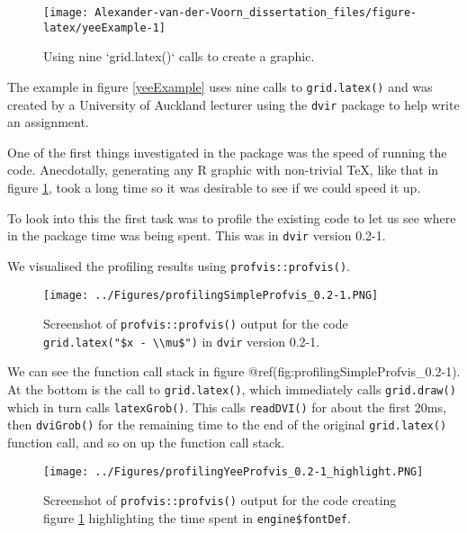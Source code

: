 \documentclass[]{article}
\begin{document}
\begin{figure}

{\centering \texttt{[image: Alexander-van-der-Voorn\_dissertation\_files/figure-latex/yeeExample-1]} 

}

\caption{Using nine `grid.latex()` calls to create a graphic.}\label{fig:yeeExample}
\end{figure}

The example in figure \ref{yeeExample} uses nine calls to
\texttt{grid.latex()} and was created by a University of Auckland
lecturer using the \texttt{dvir} package to help write an assignment.

One of the first things investigated in the package was the speed of
running the code. Anecdotally, generating any R graphic with non-trivial
\TeX{}, like that in figure \ref{fig:yeeExample}, took a long time so it
was desirable to see if we could speed it up.

To look into this the first task was to profile the existing code to let
us see where in the package time was being spent. This was in
\texttt{dvir} version 0.2-1.

We visualised the profiling results using \texttt{profvis::profvis()}.

\begin{figure}
\centering
\texttt{[image: ../Figures/profilingSimpleProfvis\_0.2-1.PNG]}
\caption{Screenshot of \texttt{profvis::profvis()} output for the code
\texttt{grid.latex("\$x\ -\ \textbackslash{}\textbackslash{}mu\$")} in
\texttt{dvir} version 0.2-1.}
\end{figure}

We can see the function call stack in figure
@ref(fig:profilingSimpleProfvis\_0.2-1). At the bottom is the call to
\texttt{grid.latex()}, which immediately calls \texttt{grid.draw()}
which in turn calls \texttt{latexGrob()}. This calls \texttt{readDVI()}
for about the first 20ms, then \texttt{dviGrob()} for the remaining time
to the end of the original \texttt{grid.latex()} function call, and so
on up the function call stack.

\begin{figure}
\centering
\texttt{[image: ../Figures/profilingYeeProfvis\_0.2-1\_highlight.PNG]}
\caption{Screenshot of \texttt{profvis::profvis()} output for the code
creating figure \ref{fig:yeeExample} highlighting the time spent in
\texttt{engine\$fontDef}.}
\end{figure}
\end{document}
